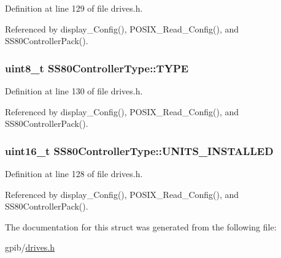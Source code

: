 Definition at line 129 of file drives.\+h.



Referenced by display\+\_\+\+Config(), P\+O\+S\+I\+X\+\_\+\+Read\+\_\+\+Config(), and S\+S80\+Controller\+Pack().

\subsubsection[{\texorpdfstring{T\+Y\+PE}{TYPE}}]{\setlength{\rightskip}{0pt plus 5cm}uint8\+\_\+t S\+S80\+Controller\+Type\+::\+T\+Y\+PE}\hypertarget{structSS80ControllerType_a255739680bca0ad3b4d1346cf5017332}{}\label{structSS80ControllerType_a255739680bca0ad3b4d1346cf5017332}


Definition at line 130 of file drives.\+h.



Referenced by display\+\_\+\+Config(), P\+O\+S\+I\+X\+\_\+\+Read\+\_\+\+Config(), and S\+S80\+Controller\+Pack().

\subsubsection[{\texorpdfstring{U\+N\+I\+T\+S\+\_\+\+I\+N\+S\+T\+A\+L\+L\+ED}{UNITS_INSTALLED}}]{\setlength{\rightskip}{0pt plus 5cm}uint16\+\_\+t S\+S80\+Controller\+Type\+::\+U\+N\+I\+T\+S\+\_\+\+I\+N\+S\+T\+A\+L\+L\+ED}\hypertarget{structSS80ControllerType_a0868c32b362ef2af2ac64fa16aee8aae}{}\label{structSS80ControllerType_a0868c32b362ef2af2ac64fa16aee8aae}


Definition at line 128 of file drives.\+h.



Referenced by display\+\_\+\+Config(), P\+O\+S\+I\+X\+\_\+\+Read\+\_\+\+Config(), and S\+S80\+Controller\+Pack().



The documentation for this struct was generated from the following file\+:\begin{DoxyCompactItemize}
\item 
gpib/\hyperlink{drives_8h}{drives.\+h}\end{DoxyCompactItemize}
